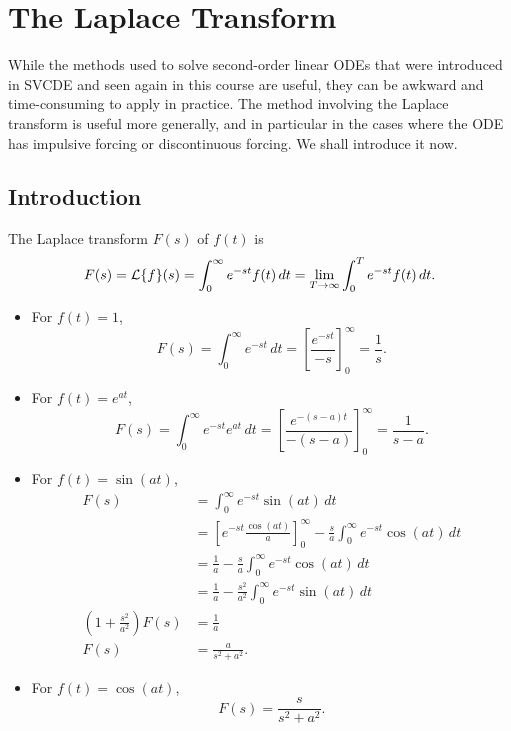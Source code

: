 \section{The Laplace Transform}

While the methods used to solve second-order linear ODEs that were introduced in SVCDE and seen again in this course are useful, they can be awkward and time-consuming to apply in practice. The method involving the Laplace transform is useful more generally, and in particular in the cases where the ODE has impulsive forcing or discontinuous forcing. We shall introduce it now.

\subsection{Introduction}

\begin{definition}
	The Laplace transform $F(s)$ of $f(t)$ is
	\begin{equation}
		F(s) = \mathcal{L}\{f\}(s) = \int_0^{\infty} e^{-st}f(t)\,dt = \lim_{T \to \infty} \int_0^T e^{-st}f(t)\,dt.
	\end{equation}
\end{definition}

\begin{eg}\label{eg:laplacetrans}\hfill
	\begin{itemize}
		\item For $f(t)=1$,
		\[
			F(s) = \int_0^{\infty} e^{-st}\,dt = \left[\frac{e^{-st}}{-s}\right]_0^{\infty} = \frac{1}{s}. \tag{$s>0$}
		\]
		\item For $f(t)=e^{at}$,
		\[
			F(s) = \int_0^{\infty} e^{-st}e^{at}\,dt = \left[\frac{e^{-(s-a)t}}{-(s-a)}\right]_0^{\infty} = \frac{1}{s-a}. \tag{$s>a$}
		\]
		\item For $f(t) = \sin(at)$,
		\begin{align*}
			F(s) &= \int_0^{\infty} e^{-st}\sin(at) \,dt \\
			&= \left[e^{-st}\frac{\cos(at)}{a}\right]_0^{\infty} - \frac{s}{a}\int_0^{\infty} e^{-st}\cos(at) \,dt \\
			&= \frac{1}{a} - \frac{s}{a}\int_0^{\infty} e^{-st}\cos(at) \,dt \\
			&= \frac{1}{a} - \frac{s^2}{a^2}\int_0^{\infty} e^{-st}\sin(at) \,dt \\
			\left(1+\frac{s^2}{a^2}\right) F(s) &= \frac{1}{a} \\
			F(s) &= \frac{a}{s^2+a^2}. \tag{$s>0$}
		\end{align*}
		\item For $f(t) = \cos(at)$,
		\[
			F(s) = \frac{s}{s^2+a^2}.
		\]
		
	\end{itemize}
\end{eg}

